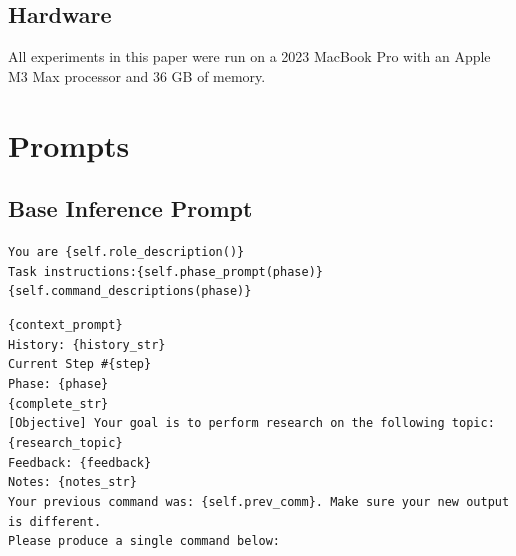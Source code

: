 \documentclass[11pt, a4paper]{gdm_format}
\begin{document}
\subsection{Hardware}

All experiments in this paper were run on a 2023 MacBook Pro with an Apple M3 Max processor and 36 GB of memory.







\section{Prompts}


\subsection{Base Inference Prompt}


\begin{tcolorbox}[breakable,colback=orange!5!white, colframe=orange!80!black, title=Base System Prompt]
\texttt{You are \{self.role\_description()\} \\Task instructions:\{self.phase\_prompt(phase)\}\\\{self.command\_descriptions(phase)\}}
\end{tcolorbox}


\begin{tcolorbox}[breakable,colback=orange!5!white, colframe=orange!80!black, title=Base Prompt]
\texttt{\{context\_prompt\}\\History: \{history\_str\}\\Current Step \#\{step\}\\Phase: \{phase\}\\\{complete\_str\}\\ {[Objective]} Your goal is to perform research on the following topic: \{research\_topic\}\\Feedback: \{feedback\}\\Notes: \{notes\_str\}\\Your previous command was: \{self.prev\_comm\}. Make sure your new output is different.\\Please produce a single command below:}
\end{tcolorbox}
\end{document}
